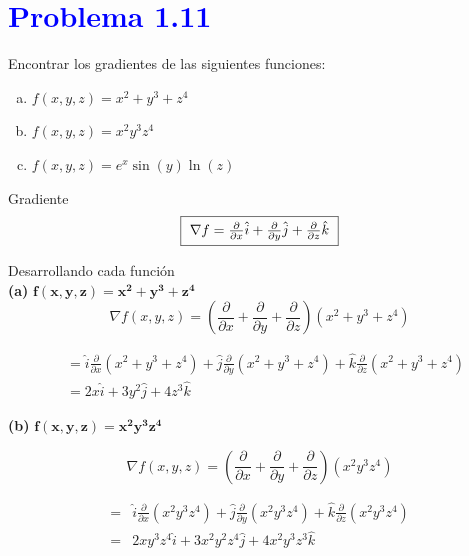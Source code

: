 \documentclass[12pt]{article}
\newcommand{\question}[1]{\textcolor{blue}{\textbf{#1}}}
\begin{document}

\section*{\question{ Problema 1.11}} Encontrar los gradientes de las siguientes funciones:
\begin{enumerate}[(a)]
    
    \item \( f(x,y,z) = x^2 + y^3 + z^4 \)  
    \item \( f(x,y,z) = x^2 y^3 z^4 \) 
    \item \( f(x,y,z) = e^x \sin(y) \ln(z) \)

\end{enumerate}

Gradiente\\
\[
\fbox{ $\nabla f = \frac{\partial}{\partial x} \hat{i} + \frac{\partial}{\partial y} \hat{j} + \frac{\partial}{\partial z} \hat{k}$ }
\]

Desarrollando cada función\\

\textbf{(a)} \( \mathbf{f(x,y,z) = x^2 + y^3 + z^4} \)
\[
\nabla f(x,y,z) = \left( \frac{\partial}{\partial x} + \frac{\partial}{\partial y} + \frac{\partial}{\partial z} \right) (x^2 + y^3 + z^4)
\]

\begin{align*}
                &= \hat{i} \frac{\partial}{\partial x} (x^2 + y^3 + z^4) 
                 + \hat{j} \frac{\partial}{\partial y} (x^2 + y^3 + z^4) 
                 + \hat{k} \frac{\partial}{\partial z} (x^2 + y^3 + z^4) \\
                &=\boxed{ 2x \hat{i} + 3y^2 \hat{j} + 4z^3 \hat{k}}
\end{align*}

\textbf{(b) } \( \mathbf{f(x, y, z) = x^2y^3z^4} \)

\[
\nabla f(x,y,z) = \left( \frac{\partial}{\partial x} + \frac{\partial}{\partial y} + \frac{\partial}{\partial z} \right) (x^2 y^3 z^4)
\]

\begin{align*}
    =& \hat{i} \frac{\partial}{\partial x} (x^2 y^3 z^4) + \hat{j} \frac{\partial}{\partial y} (x^2 y^3 z^4) + \hat{k} \frac{\partial}{\partial z} (x^2 y^3 z^4) \\
    =&\boxed{ 2x y^3 z^4 \hat{i}  + 3x^2 y^2 z^4 \hat{j}  + 4x^2 y^3 z^3 \hat{k}} 
\end{align*}
\end{document}

